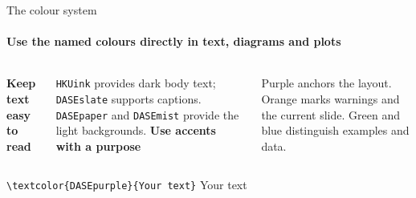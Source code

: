 \documentclass[aspectratio=169,10pt]{beamer}
\begin{document}
\begin{frame}{The colour system}
  \framesubtitle{Use the named colours directly in text, diagrams and plots}
  \begin{center}
  \end{center}
  \medskip
  \begin{columns}[T,onlytextwidth]
      \textbf{Keep text easy to read}\par\smallskip
      \small \texttt{HKUink} provides dark body text; \texttt{DASEslate} supports captions. \texttt{DASEpaper} and \texttt{DASEmist} provide the light backgrounds.
      \textbf{Use accents with a purpose}\par\smallskip
      \small Purple anchors the layout. Orange marks warnings and the current slide. Green and blue distinguish examples and data.
  \end{columns}
  \vfill
  {\small\texttt{\textbackslash textcolor\{DASEpurple\}\{Your text\}} \quad\textcolor{DASEpurple}{Your text}}
\end{frame}
\end{document}
